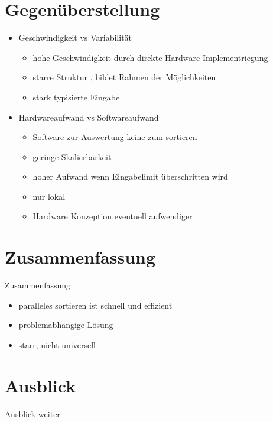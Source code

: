 \documentclass[ucs,9pt]{beamer}
\begin{document}
\section{Gegenüberstellung}
\begin{frame}
    \begin{itemize}
        \item Geschwindigkeit vs Variabilität
        \begin{itemize}
            \item hohe Geschwindigkeit durch direkte Hardware Implementriegung
            \item starre Struktur , bildet Rahmen der Möglichkeiten
            \item stark typisierte Eingabe
        \end{itemize}
    \item Hardwareaufwand vs Softwareaufwand
        \begin{itemize}
            \item Software zur Auswertung keine zum sortieren
            \item geringe Skalierbarkeit
            \item hoher Aufwand wenn Eingabelimit überschritten wird
            \item nur lokal
            \item Hardware Konzeption eventuell aufwendiger
        \end{itemize}
    \end{itemize}
\end{frame}

\section{Zusammenfassung}
\begin{frame}{Zusammenfassung}
\begin{itemize}
  \item paralleles sortieren ist schnell und effizient 
  \item problemabhängige Lösung
  \item starr, nicht universell
\end{itemize}
\end{frame}

\section{Ausblick}
\begin{frame}{Ausblick}
weiter
\end{frame}
\end{document}

